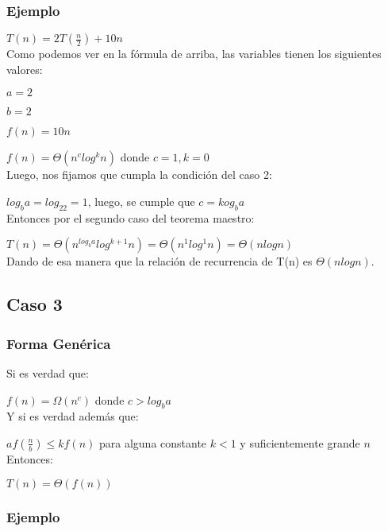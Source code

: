 \documentclass[12pt, letterpaper]{article} %
\begin{document}
\subsubsection{Ejemplo}
$T(n)=2T(\frac{n}{2})+10n$\\
Como podemos ver en la fórmula de arriba, las variables tienen los siguientes valores:
\par \hspace{2mm} $a=2$
\par \hspace{2mm} $b=2$
\par \hspace{2mm} $f(n)=10n$
\par \hspace{2mm} $f(n)=\Theta(n^clog^kn)$ donde $c=1, k=0$\\
Luego, nos fijamos que cumpla la condición del caso 2:
\par \hspace{2mm} $log_ba=log_22=1$, luego, se cumple que $c=kog_ba$\\
Entonces por el segundo caso del teorema maestro:
\par \hspace{2mm} $T(n)=\Theta(n^{log_ba}log^{k+1}n)=\Theta(n^1log^1n)=\Theta(nlogn)$\\
Dando de esa manera que la relación de recurrencia de T(n) es $\Theta(nlogn)$.

\subsection{Caso 3}

\subsubsection{Forma Genérica}
Si es verdad que:
\par\hspace{2mm} $f(n)=\Omega(n^c)$ donde $c>log_ba$\\
Y si es verdad además que:
\par\hspace{2mm} $af(\frac{n}{b})\leq kf(n)$ para alguna constante $k<1$ y suficientemente grande $n$\\
Entonces:
\par\hspace{2mm} $T(n)=\Theta(f(n))$

\subsubsection{Ejemplo}
\end{document}
